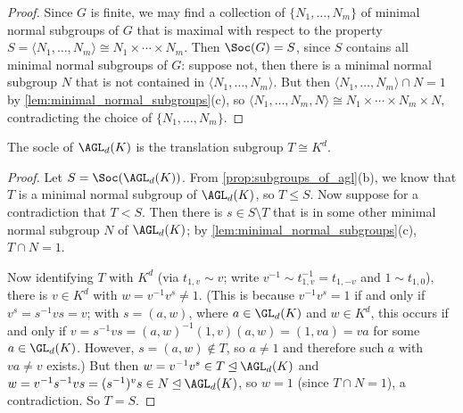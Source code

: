 \begin{proposition}\label{prop:socle_is_product_of_minimal_normal_subgroups}
\end{proposition}

\begin{proof}
    Since $G$ is finite, we may find a collection of $\{N_1,\dotsc,N_m\}$ of minimal normal subgroups of $G$ that is maximal with respect to the property $S = \langle N_1,\dotsc,N_m \rangle \cong N_1 \times \dotsb \times N_m$. Then $\Soc(G) = S$, since $S$ contains all minimal normal subgroups of $G$: suppose not, then there is a minimal normal subgroup $N$ that is not contained in $\langle N_1,\dotsc,N_m \rangle$. But then $\langle N_1,\dotsc,N_m \rangle \cap N = 1$ by \autoref{lem:minimal_normal_subgroups}(c), so $\langle N_1,\dotsc,N_m,N \rangle \cong N_1 \times \dotsb \times N_m \times N$, contradicting the choice of $\{N_1,\dotsc,N_m\}$.
\end{proof}

\begin{proposition}\label{prop:socle_agl}
    The socle of $\AGL_d(K)$ is the translation subgroup $T \cong K^d$.
\end{proposition}

\begin{proof}
    Let $S = \Soc(\AGL_d(K))$. From \autoref{prop:subgroups_of_agl}(b), we know that $T$ is a minimal normal subgroup of $\AGL_d(K)$, so $T \leq S$. Now suppose for a contradiction that $T < S$. Then there is $s \in S \setminus T$ that is in some other minimal normal subgroup $N$ of $\AGL_d(K)$; by \autoref{lem:minimal_normal_subgroups}(c), $T \cap N = 1$.

    Now identifying $T$ with $K^d$ (via $t_{1,v} \sim v$; write $v^{-1} \sim t_{1,v}^{-1} = t_{1,-v}$ and $1 \sim t_{1,0}$), there is $v \in K^d$ with $w = v^{-1}v^s \neq 1$. (This is because $v^{-1}v^s = 1$ if and only if $v^s = s^{-1}vs = v$; with $s = (a,w)$, where $a \in \GL_d(K)$ and $w \in K^d$, this occurs if and only if $v = s^{-1}vs = (a,w)^{-1}(1,v)(a,w) = (1,va) = va$ for some $a \in \GL_d(K)$. However, $s = (a,w) \not\in T$, so $a \neq 1$ and therefore such $a$ with $va \neq v$ exists.) But then $w = v^{-1}v^s \in T \unlhd \AGL_d(K)$ and $w = v^{-1}s^{-1}vs = (s^{-1})^vs \in N \unlhd \AGL_d(K)$, so $w = 1$ (since $T \cap N = 1$), a contradiction. So $T = S$.
\end{proof}


